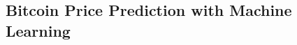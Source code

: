 \documentclass[12pt,a4paper,oneside]{article}
\begin{document}
\subsection{Bitcoin Price Prediction with Machine Learning}\label{subsec:lit_btc}

%
%
%
%
%
%
%
%
%
%
%
%
\end{document}
